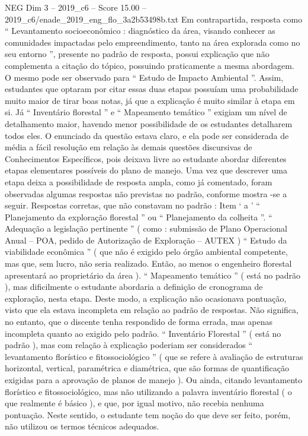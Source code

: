 \begin{textsample}{NEG Dim 3 – 2019\_c6 – Score 15.00 – 2019\_c6/enade\_2019\_eng\_flo\_3a2b53498b.txt}
Em contrapartida, resposta como “ Levantamento socioeconômico : diagnóstico da área, visando conhecer as comunidades impactadas pelo empreendimento, tanto na área explorada como no seu entorno ”, presente no padrão de resposta, possui explicação que não complementa a citação do tópico, possuindo praticamente a mesma abordagem.
O mesmo pode ser observado para “ Estudo de Impacto Ambiental ”.
Assim, estudantes que optaram por citar essas duas etapas possuíam uma probabilidade muito maior de tirar boas notas, já que a explicação é muito similar à etapa em si.
Já “ Inventário florestal ” e “ Mapeamento temático ” exigiam um nível de detalhamento maior, havendo menor possibilidade de os estudantes detalharem todos eles.
O enunciado da questão estava claro, e ela pode ser considerada de média a fácil resolução em relação às demais questões discursivas de Conhecimentos Específicos, pois deixava livre ao estudante abordar diferentes etapas elementares possíveis do plano de manejo.
Uma vez que descrever uma etapa deixa a possibilidade de resposta ampla, como já comentado, foram observadas algumas respostas não previstas no padrão, conforme mostra -se a seguir.
Respostas corretas, que não constavam no padrão : Item ‘ a ’ “ Planejamento da exploração florestal ” ou “ Planejamento da colheita ”. “ Adequação a legislação pertinente ” ( como : submissão de Plano Operacional Anual – POA, pedido de Autorização de Exploração – AUTEX ) “ Estudo da viabilidade econômica ” ( que não é exigido pelo órgão ambiental competente, mas que, sem lucro, não seria realizado.
Então, ao menos o engenheiro florestal apresentará ao proprietário da área ). “ Mapeamento temático ” ( está no padrão ), mas dificilmente o estudante abordaria a definição de cronograma de exploração, nesta etapa.
Deste modo, a explicação não ocasionava pontuação, visto que ela estava incompleta em relação ao padrão de respostas.
Não significa, no entanto, que o discente tenha respondido de forma errada, mas apenas incompleta quanto ao exigido pelo padrão. “ Inventário Florestal ” ( está no padrão ), mas com relação à explicação poderiam ser considerados “ levantamento florístico e fitossociológico ” ( que se refere à avaliação de estruturas horizontal, vertical, paramétrica e diamétrica, que são formas de quantificação exigidas para a aprovação de planos de manejo ).
Ou ainda, citando levantamento florístico e fitossociológico, mas não utilizando a palavra inventário florestal ( o que realmente é básico ), e que, por igual motivo, não recebia nenhuma pontuação.
Neste sentido, o estudante tem noção do que deve ser feito, porém, não utilizou os termos técnicos adequados.

\end{textsample}
